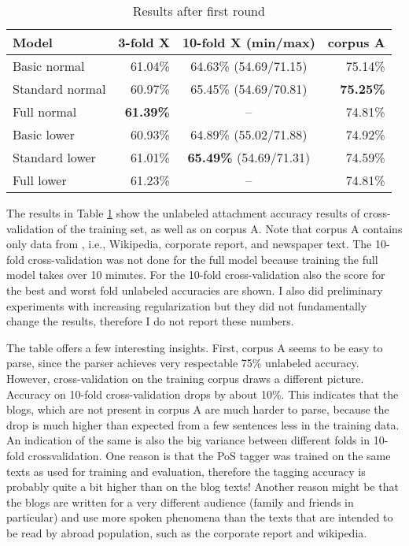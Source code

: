 \documentclass[11pt,letterpaper, covington]{article}
\begin{document}
\begin{table}
\center
  \begin{tabular}{ | l || r | c | r | }
    \hline
   \textbf{Model} & \textbf{3-fold X} & \textbf{10-fold X (min/max)} & \textbf{corpus A}  \\ \hline
    Basic normal & 61.04\% & 64.63\% (54.69/71.15) & 75.14\% \\
    Standard normal & 60.97\% & 65.45\% (54.69/70.81) & \textbf{75.25\%} \\ 
    Full normal & \textbf{61.39\%} & -- & 74.81\% \\ \hline
    Basic lower & 60.93\% & 64.89\% (55.02/71.88) & 74.92\% \\
    Standard lower & 61.01\% & \textbf{65.49\%} (54.69/71.31) & 74.59\% \\
    Full lower & 61.23\% & -- & 74.81\%  \\ \hline
  \end{tabular}
\caption{Results after first round}
\label{tab:dec}
\end{table}

The results in Table \ref{tab:dec} show the unlabeled attachment accuracy results of cross-validation of the training set, as well as on corpus A. Note that corpus A contains only data from \cite{AH14}, i.e., Wikipedia, corporate report, and newspaper text. The 10-fold cross-validation was not done for the full model because training the full model takes over 10 minutes. For the 10-fold cross-validation also the score for the best and worst fold unlabeled accuracies are shown. I also did preliminary experiments with increasing regularization but they did not fundamentally change the results, therefore I do not report these numbers.

The table offers a few interesting insights. First, corpus A seems to be easy to parse, since the parser achieves very respectable 75\% unlabeled accuracy. However, cross-validation on the training corpus draws a different picture. Accuracy on 10-fold cross-validation drops by about 10\%. This indicates that the blogs, which are not present in corpus A are much harder to parse, because the drop is much higher than expected from a few sentences less in the training data. An indication of the same is also the big variance between different folds in 10-fold crossvalidation. One reason is that the PoS tagger was trained on the same texts as used for training and evaluation, therefore the tagging accuracy is probably quite a bit higher than on the blog texts! Another reason might be that the blogs are written for a very different audience (family and friends in particular) and use more spoken phenomena than the texts that are intended to be read by abroad population, such as the corporate report and wikipedia.
\end{document}
